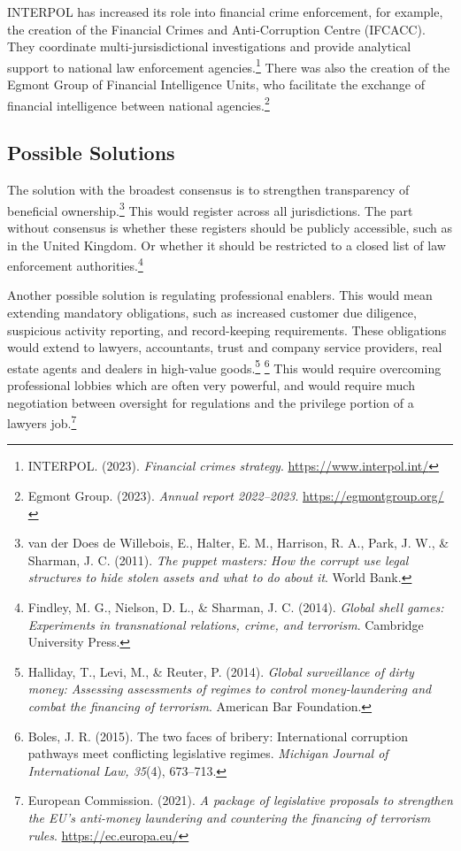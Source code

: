 INTERPOL has increased its role into financial crime enforcement, for example, the creation of the Financial Crimes and Anti-Corruption Centre (IFCACC). They coordinate multi-jursisdictional investigations and provide analytical support to national law enforcement agencies.\footnote{INTERPOL. (2023). \emph{Financial crimes strategy}. \url{https://www.interpol.int/}} There was also the creation of the Egmont Group of Financial Intelligence Units, who facilitate the exchange of financial intelligence between national agencies.\footnote{Egmont Group. (2023). \emph{Annual report 2022–2023}. \url{https://egmontgroup.org/}}

\subsection{Possible Solutions}

The solution with the broadest consensus is to strengthen transparency of beneficial ownership.\footnote{van der Does de Willebois, E., Halter, E. M., Harrison, R. A., Park, J. W., \& Sharman, J. C. (2011). \emph{The puppet masters: How the corrupt use legal structures to hide stolen assets and what to do about it}. World Bank.} This would register across all jurisdictions. The part without consensus is whether these registers should be publicly accessible, such as in the United Kingdom. Or whether it should be restricted to a closed list of law enforcement authorities.\footnote{Findley, M. G., Nielson, D. L., \& Sharman, J. C. (2014). \emph{Global shell games: Experiments in transnational relations, crime, and terrorism}. Cambridge University Press.}

Another possible solution is regulating professional enablers. This would mean extending mandatory obligations, such as increased customer due diligence, suspicious activity reporting, and record-keeping requirements. These obligations would extend to lawyers, accountants, trust and company service providers, real estate agents and dealers in high-value goods.\footnote{Halliday, T., Levi, M., \& Reuter, P. (2014). \emph{Global surveillance of dirty money: Assessing assessments of regimes to control money-laundering and combat the financing of terrorism}. American Bar Foundation.} \footnote{Boles, J. R. (2015). The two faces of bribery: International corruption pathways meet conflicting legislative regimes. \emph{Michigan Journal of International Law, 35}(4), 673–713.} This would require overcoming professional lobbies which are often very powerful, and would require much negotiation between oversight for regulations and the privilege portion of a lawyers job.\footnote{European Commission. (2021). \emph{A package of legislative proposals to strengthen the EU's anti-money laundering and countering the financing of terrorism rules}. \url{https://ec.europa.eu/}}

